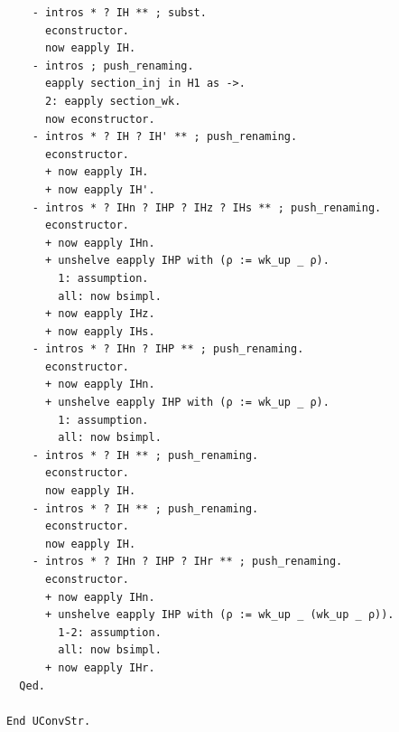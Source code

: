 \begin{lstlisting}
    - intros * ? IH ** ; subst.
      econstructor.
      now eapply IH.
    - intros ; push_renaming.
      eapply section_inj in H1 as ->.
      2: eapply section_wk.
      now econstructor.
    - intros * ? IH ? IH' ** ; push_renaming.
      econstructor.
      + now eapply IH.
      + now eapply IH'.
    - intros * ? IHn ? IHP ? IHz ? IHs ** ; push_renaming.
      econstructor.
      + now eapply IHn.
      + unshelve eapply IHP with (ρ := wk_up _ ρ).
        1: assumption.
        all: now bsimpl.
      + now eapply IHz.
      + now eapply IHs.
    - intros * ? IHn ? IHP ** ; push_renaming.
      econstructor.
      + now eapply IHn.
      + unshelve eapply IHP with (ρ := wk_up _ ρ).
        1: assumption.
        all: now bsimpl.
    - intros * ? IH ** ; push_renaming.
      econstructor.
      now eapply IH.
    - intros * ? IH ** ; push_renaming.
      econstructor.
      now eapply IH.
    - intros * ? IHn ? IHP ? IHr ** ; push_renaming.
      econstructor.
      + now eapply IHn.
      + unshelve eapply IHP with (ρ := wk_up _ (wk_up _ ρ)).
        1-2: assumption.
        all: now bsimpl.
      + now eapply IHr.
  Qed.

End UConvStr.
\end{lstlisting}

